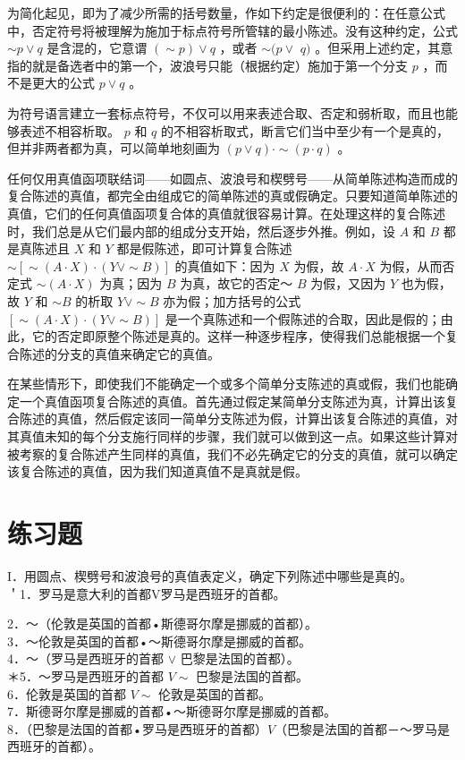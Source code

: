 为简化起见，即为了减少所需的括号数量，作如下约定是很便利的：在任意公式中，否定符号将被理解为施加于标点符号所管辖的最小陈述。没有这种约定，公式 $\sim p \vee q$ 是含混的，它意谓 $(\sim p) \vee q$ ，或者 $\sim(p \vee$ $q)$ 。但采用上述约定，其意指的就是备选者中的第一个，波浪号只能（根据约定）施加于第一个分支 $p$ ，而不是更大的公式 $p \vee q$ 。

为符号语言建立一套标点符号，不仅可以用来表述合取、否定和弱析取，而且也能够表述不相容析取。 $p$ 和 $q$ 的不相容析取式，断言它们当中至少有一个是真的，但并非两者都为真，可以简单地刻画为 $(p \vee q) \cdot \sim(p \cdot q)$ 。

任何仅用真值函项联结词——如圆点、波浪号和楔劈号——从简单陈述构造而成的复合陈述的真值，都完全由组成它的简单陈述的真或假确定。只要知道简单陈述的真值，它们的任何真值函项复合体的真值就很容易计算。在处理这样的复合陈述时，我们总是从它们最内部的组成分支开始，然后逐步外推。例如，设 $A$ 和 $B$ 都是真陈述且 $X$ 和 $Y$ 都是假陈述，即可计算复合陈述 $\sim[\sim(A \cdot X) \cdot(Y \vee \sim B)]$ 的真值如下：因为 $X$ 为假，故 $A \cdot X$ 为假，从而否定式 $\sim(A \cdot X)$ 为真；因为 $B$ 为真，故它的否定～ $B$ 为假，又因为 $Y$ 也为假，故 $Y$ 和 $\sim B$ 的析取 $Y \vee \sim B$ 亦为假；加方括号的公式 $[\sim(A \cdot X) \cdot(Y \vee \sim B)]$ 是一个真陈述和一个假陈述的合取，因此是假的；由此，它的否定即原整个陈述是真的。这样一种逐步程序，使得我们总能根据一个复合陈述的分支的真值来确定它的真值。

在某些情形下，即使我们不能确定一个或多个简单分支陈述的真或假，我们也能确定一个真值函项复合陈述的真值。首先通过假定某简单分支陈述为真，计算出该复合陈述的真值，然后假定该同一简单分支陈述为假，计算出该复合陈述的真值，对其真值未知的每个分支施行同样的步骤，我们就可以做到这一点。如果这些计算对被考察的复合陈述产生同样的真值，我们不必先确定它的分支的真值，就可以确定该复合陈述的真值，因为我们知道真值不是真就是假。

\section*{练习题}
I．用圆点、楔劈号和波浪号的真值表定义，确定下列陈述中哪些是真的。\\
＇1．罗马是意大利的首都V罗马是西班牙的首都。

2．～（伦敦是英国的首都•斯德哥尔摩是挪威的首都）。\\
3．～伦敦是英国的首都•～斯德哥尔摩是挪威的首都。\\
4．～（罗马是西班牙的首都 $\vee$ 巴黎是法国的首都）。\\
＊5．～罗马是西班牙的首都 $V \sim$ 巴黎是法国的首都。\\
6．伦敦是英国的首都 $V \sim$ 伦敦是英国的首都。\\
7．斯德哥尔摩是挪威的首都•～斯德哥尔摩是挪威的首都。\\
8．（巴黎是法国的首都•罗马是西班牙的首都）$V$（巴黎是法国的首都－～罗马是西班牙的首都）。

